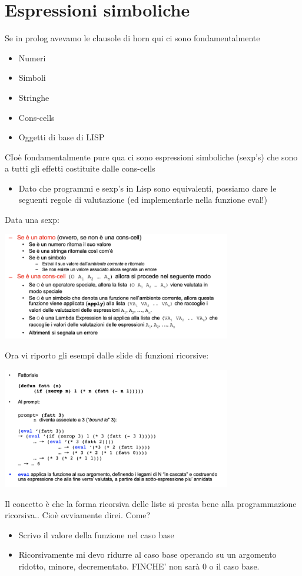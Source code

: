 \documentclass[12pt, a4paper, openany, oneside]{book}
\begin{document}
\section{Espressioni simboliche}
Se in prolog avevamo le clausole di horn qui ci sono fondamentalmente
\begin{itemize}
	\item Numeri
	\item Simboli
	\item Stringhe
	\item Cons-cells
	\item Oggetti di base di LISP
\end{itemize}
CIoè fondamentalmente pure qua ci sono espressioni simboliche (sexp's) che sono
a tutti gli effetti costituite dalle cons-cells
\begin{itemize}
	\item Dato che programmi e sexp’s in Lisp sono equivalenti, possiamo dare
	le seguenti regole di valutazione (ed implementarle nella funzione eval!)
\end{itemize}
Data una sexp: 
\begin{center}
\includegraphics[width=0.75\textwidth]{19}
\end{center}
Ora vi riporto gli esempi dalle slide di funzioni ricorsive:
\begin{center}
\includegraphics[width=0.75\textwidth]{20}
\end{center}
Il concetto è che la forma ricorsiva delle liste si presta bene alla programmazione
ricorsiva.. Cioè ovviamente direi.
Come?
\begin{itemize}
	\item Scrivo il valore della funzione nel caso base
	\item Ricorsivamente mi devo ridurre al caso base operando su un argomento
	ridotto, minore, decrementato. FINCHE' non sarà 0 o il caso base.
\end{itemize}
\end{document}
